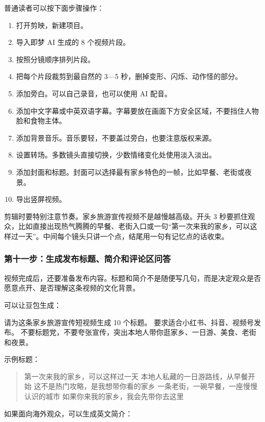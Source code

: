 普通读者可以按下面步骤操作：
\begin{enumerate}
    \item 打开剪映，新建项目。
    \item 导入即梦 AI 生成的 8 个视频片段。
    \item 按照分镜顺序排列片段。
    \item 把每个片段裁剪到最自然的 3—5 秒，删掉变形、闪烁、动作怪的部分。
    \item 添加旁白。可以自己录音，也可以使用 AI 配音。
    \item 添加中文字幕或中英双语字幕。字幕要放在画面下方安全区域，不要挡住人物脸和食物主体。
    \item 添加背景音乐。音乐要轻，不要盖过旁白，也要注意版权来源。
    \item 设置转场。多数镜头直接切换，少数情绪变化处使用淡入淡出。
    \item 添加封面和标题。封面可以选择最有家乡特色的一帧，比如早餐、老街或夜景。
    \item 导出竖屏视频。
\end{enumerate}

剪辑时要特别注意节奏。家乡旅游宣传视频不是越慢越高级。开头 3 秒要抓住观众，比如直接出现热气腾腾的早餐、老街入口或一句“第一次来我的家乡，可以这样过一天”。中间每个镜头只讲一个点，结尾用一句有记忆点的话收束。

\subsubsection*{第十一步：生成发布标题、简介和评论区问答}

视频完成后，还要准备发布内容。标题和简介不是随便写几句，而是决定观众是否愿意点开、是否理解这条视频的文化背景。

可以让豆包生成：

\begin{tcolorbox}[promptbox]
请为这条家乡旅游宣传短视频生成 10 个标题。
要求适合小红书、抖音、视频号发布。
不要标题党，不要夸张宣传，突出本地人带你逛家乡、一日游、美食、老街和夜景。
\end{tcolorbox}

示例标题：
\begin{quote}
第一次来我的家乡，可以这样过一天
本地人私藏的一日游路线，从早餐开始
这不是热门攻略，是我想带你看的家乡
一条老街，一碗早餐，一座慢慢认识的城市
如果你来我的家乡，我会先带你去这里
\end{quote}

如果面向海外观众，可以生成英文简介：

